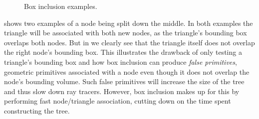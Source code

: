 \begin{figure}
  \centering
  \caption{Box inclusion examples.}
  \label{fig:boxInclusion}
\end{figure}


 shows two examples of a node being split down the
middle. In both examples the triangle will be associated with both new nodes, as
the triangle's bounding box overlaps both nodes. But in
 we clearly see that the triangle itself does not
overlap the right node's bounding box. This illustrates the drawback of only
testing a triangle's bounding box and how box inclusion can produce
\textit{false primitives}, geometric primitives associated with a node even
though it does not overlap the node's bounding volume. Such false primitives
will increase the size of the tree and thus slow down ray tracers. However, box
inclusion makes up for this by performing fast node/triangle association,
cutting down on the time spent constructing the tree.









